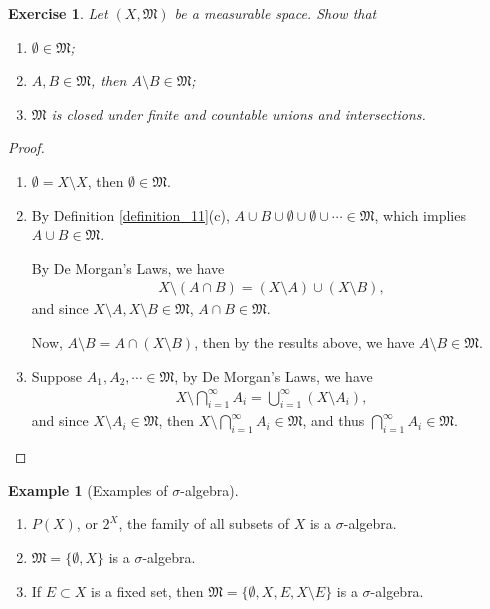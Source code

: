 \documentclass[11pt]{book}
\newtheorem{exercise}{Exercise}[section]
\theoremstyle{definition}
\newtheorem{example}{Example}[chapter]
\numberwithin{equation}{chapter}
\def\MM{\mathfrak{M}}
\begin{document}
\medskip

\begin{exercise}\label{exercise_11} {\rm \cite{1}}
Let $(X, \MM)$ be a measurable space. Show that
\begin{enumerate}[label=(\alph*)]
    \item $\emptyset \in \MM$;
    
    \item $A, B \in \MM$, then $A \setminus B \in \MM$;
    
    \item $\MM$ is closed under finite and countable unions and intersections.
\end{enumerate}
\end{exercise}
\begin{proof}
~\begin{enumerate}[label=(\alph*)]
    \item $\emptyset = X \setminus X$, then $\emptyset \in \MM$.
   
    \item By Definition \ref{definition_11}(c), $A \cup B \cup \emptyset \cup \emptyset \cup \cdots \in \MM$, which implies $A \cup B \in \MM$. 
    
    By De Morgan's Laws, we have 
    \begin{align*}
        X \setminus (A \cap B) = (X \setminus A) \cup (X \setminus B),
    \end{align*}
    and since $X \setminus A, X \setminus B \in \MM$, $A \cap B \in \MM$.
    
    Now, $A \setminus B = A \cap (X \setminus B)$, then by the results above, we have $A \setminus B \in \MM$.
    
    \item Suppose $A_1, A_2, \cdots \in \MM$, by De Morgan's Laws, we have
    \begin{align*}
        X \setminus \bigcap^\infty_{i=1} A_i = \bigcup^\infty_{i=1} (X \setminus A_i),
    \end{align*}
    and since $X \setminus A_i \in \MM$, then $X \setminus \bigcap^\infty_{i=1} A_i \in \MM$, and thus $\bigcap^\infty_{i=1} A_i \in \MM$. 
\end{enumerate}
\end{proof}

\medskip

\begin{example}[Examples of $\sigma$-algebra]
~\begin{enumerate}[label=(\alph*)]
    \item $P(X)$, or $2^X$, the family of all subsets of $X$ is a $\sigma$-algebra.
    
    \item $\MM = \{\emptyset, X\}$ is a $\sigma$-algebra.
    
    \item If $E \subset X$ is a fixed set, then $\MM = \{\emptyset, X, E, X\setminus E\}$ is a $\sigma$-algebra.
\end{enumerate}
\end{example}
\end{document}
